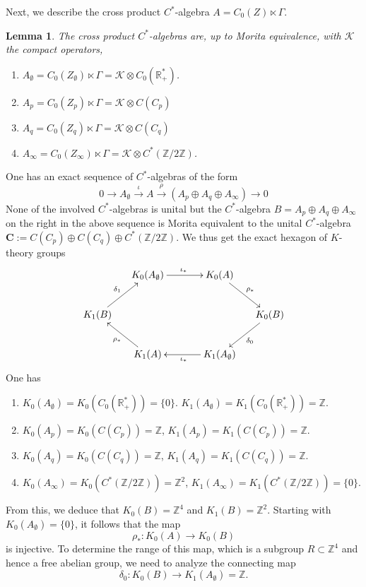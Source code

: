 \documentclass[letterpaper,11pt]{article}
\def\R{\mathbb{R}}
\def\Z{\mathbb{Z}}
\theoremstyle{plain}
\newtheorem{lem}[thm]{Lemma}
\begin{document}
Next, we describe the cross product $C^*$-algebra $A=C_0(Z)\ltimes \Gamma$.
\begin{lem} The cross product $C^*$-algebras are, up to Morita equivalence, with $\mathcal K$ the compact operators,
\begin{enumerate}
	\item $A_\emptyset=C_0(Z_\emptyset)\ltimes \Gamma=\mathcal K\otimes C_0(\R_+^*)$.
	\item $A_p=C_0(Z_p)\ltimes \Gamma=\mathcal K\otimes C(C_p)$	\item $A_q=C_0(Z_q)\ltimes \Gamma=\mathcal K\otimes C(C_q)$
	\item $A_\infty =C_0(Z_\infty)\ltimes \Gamma= \mathcal K\otimes C^*(\Z/2\Z)$.
\end{enumerate} 	
\end{lem}

One has an exact sequence of $C^*$-algebras of the form 
$$
0\to A_\emptyset\stackrel{\iota}{\to} A\stackrel{\rho}{\to} \left(A_p\oplus A_q\oplus A_\infty\right)\to 0 
$$
None of the involved $C^*$-algebras is unital but the $C^*$-algebra $B=A_p\oplus A_q\oplus A_\infty$ on the right in the above sequence is Morita equivalent to the unital $C^*$-algebra $\mathbf C:=C(C_p)\oplus C(C_q)\oplus C^*(\Z/2\Z)$.
We thus get the exact hexagon of $K$-theory groups
\begin{equation}\label{sixterm}
\begin{gathered}
\xymatrix@C-1em{
& K_0(A_\emptyset) \ar[rr]^{\iota_*} && K_0(A) \ar[dr]^{\rho_*} \\
K_1(B) \ar[ur]^{\delta_1} &&&& K_0(B) \ar[dl]^{\delta_0} \\
& K_1(A) \ar[ul]^{\rho_*} && K_1(A_\emptyset) \ar[ll]^{\iota_*}
}
\end{gathered}
\end{equation}
One has
\begin{enumerate}
	\item $K_0(A_\emptyset)=K_0( C_0(\R_+^*))=\{0\}$. $K_1(A_\emptyset)=K_1( C_0(\R_+^*))=\Z$.
	\item $K_0(A_p)=K_0(C(C_p))=\Z$, $K_1(A_p)=K_1(C(C_p))=\Z$.
	\item $K_0(A_q)=K_0(C(C_q))=\Z$, $K_1(A_q)=K_1(C(C_q))=\Z$.
	\item $K_0(A_\infty) =K_0(C^*(\Z/2\Z))=\Z^2$, $K_1(A_\infty) =K_1(C^*(\Z/2\Z))=\{0\}$.
\end{enumerate}

 From this, we deduce that $ K_0(B) = \Z^4 $ and $ K_1(B) = \Z^2 $. Starting with $ K_0(A_\emptyset) = \{0\} $, it follows that the map  
\[
\rho_*: K_0(A) \to K_0(B)
\]  
is injective. To determine the range of this map, which is a subgroup $ R \subset \Z^4 $ and hence a free abelian group, we need to analyze the connecting map  
\[
\delta_0: K_0(B) \to K_1(A_\emptyset) = \Z.
\]  
\end{document}

